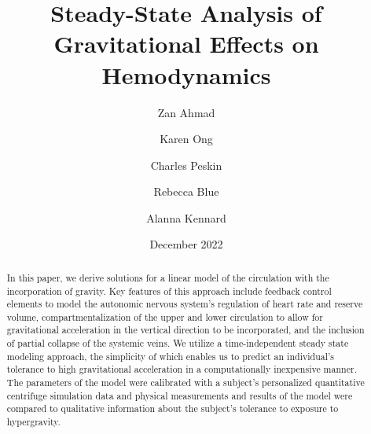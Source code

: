 \documentclass[12pt]{article}
\title{Steady-State Analysis of Gravitational Effects on Hemodynamics}
\author[1,2]{Zan Ahmad}
\author[]{Karen Ong}
\author[]{Charles Peskin}
\author[]{Rebecca Blue}
\author[]{Alanna Kennard}
\affil[1]{Courant Institute of Mathematical Sciences, New York University}
\affil[2]{Johns Hopkins University Department of Applied Mathematics and Statistics}
\date{December 2022}
\begin{document}
\maketitle
\begin{abstract}
    In this paper, we derive solutions for a linear model of the circulation with the incorporation of gravity. Key features of this approach include feedback control elements to model the autonomic nervous system's regulation of heart rate and reserve volume, compartmentalization of the upper and lower circulation to allow for gravitational acceleration in the vertical direction to be incorporated, and the inclusion of partial collapse of the systemic veins. We utilize a time-independent steady state modeling approach, the simplicity of which enables us to predict an individual's tolerance to high gravitational acceleration in a computationally inexpensive manner. The parameters of the model were calibrated with a subject's personalized quantitative centrifuge simulation data and physical measurements and results of the model were compared to qualitative information about the subject's tolerance to exposure to hypergravity. 
\end{abstract}
\end{document}
